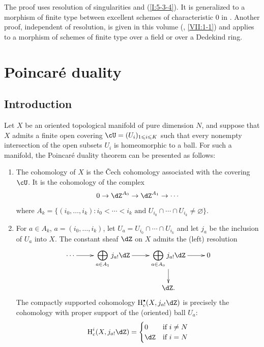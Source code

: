 The proof uses resolution of singularities and (\ref{I:5-3-4}). It is
generalized to a morphism of finite type between excellent schemes of
characteristic $0$ in \cite[XIX.5]{sga4}. Another proof, independent of
resolution, is given in this volume (, \ref{VII:1-1})
and applies to a morphism of schemes of finite type over a field or over
a Dedekind ring.

\section{Poincaré duality}

\subsection{Introduction}\label{I:6-1}

Let $X$ be an oriented topological manifold of pure dimension $N$, and
suppose that $X$ admits a finite open covering
$\cU=(U_i)_{1\leqslant i\leqslant K}$ such that every nonempty
intersection of the open subsets $U_i$ is homeomorphic to a ball. For
such a manifold, the Poincaré duality theorem can be presented as follows:
\begin{enumerate}[\indent A]
  \item The cohomology of $X$ is the \v Cech cohomology associated with
    the covering $\cU$. It is the cohomology of the complex
    \begin{equation}\label{I:eq:6-1}
      0 \to \dZ^{A_0} \to \dZ^{A_1} \to \cdots
    \end{equation}
    where
    $A_k=\{(i_0,\dotsc,i_k):i_0<\cdots<i_k\text{ and }U_{i_0}\cap\cdots\cap U_{i_k}\ne\varnothing\}$.
  \item For $a\in A_k$, $a=(i_0,\dotsc,i_k)$, let
    $U_a=U_{i_0}\cap\cdots\cap U_{i_k}$ and let $j_a$ be the inclusion
    of $U_a$ into $X$. The constant sheaf $\dZ$ on $X$ admits the
    (left) resolution
    \begin{equation}\label{I:eq:6-2}
      \xymatrix{
        \cdots \ar[r]
          & \displaystyle\bigoplus_{a\in A_1} j_{a!}\dZ \ar[r]
          & \displaystyle\bigoplus_{a\in A_0} j_{a!} \dZ \ar[r] \ar[d]
          & 0 \\
        & & \dZ \text{.}
      }
    \end{equation}
    The compactly supported cohomology $\h_c^\bullet(X,j_{a!}\dZ)$ is
    precisely the cohomology with proper support of the (oriented) ball
    $U_a$:
      \[
        \h_c^i(X,j_{a!}\dZ) = \begin{cases}
                                0   & \text{if $i\ne N$} \\
                                \dZ & \text{if $i = N$}
                              \end{cases}
      \]
\end{enumerate}

